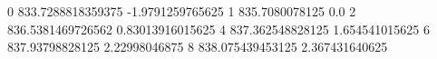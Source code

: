 0 833.7288818359375 -1.9791259765625
1 835.7080078125 0.0
2 836.5381469726562 0.83013916015625
4 837.362548828125 1.654541015625
6 837.93798828125 2.22998046875
8 838.075439453125 2.367431640625
